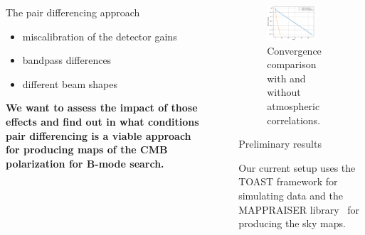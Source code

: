 \documentclass[final]{beamer}
\newlength{\sepwidth}
\newlength{\colwidth}
\newcommand{\separatorcolumn}{\begin{column}{\sepwidth}\end{column}}
\begin{document}
\begin{frame}[t]
\begin{columns}[t]
\begin{column}{\colwidth}
\begin{alertblock}{The pair differencing approach}
        \begin{itemize}
          \item miscalibration of the detector gains
          \item bandpass differences
          \item different beam shapes
        \end{itemize}

      \end{alertblock}

      \textbf{We want to assess the impact of those effects and find out in what conditions pair differencing is a viable approach for producing maps of the CMB polarization for B-mode search.}

    \end{column}

    \separatorcolumn

    \begin{column}{\colwidth}

      \begin{figure}
        \centering
        \includegraphics[width=0.7\textwidth]{figures/convergence.png}
        \caption{Convergence comparison with and without atmospheric correlations.}
        \label{fig:convergence}
      \end{figure}

      \begin{block}{Preliminary results}


        Our current setup uses the TOAST framework for simulating data and the MAPPRAISER library~\cite{ElBouhargani:2021umq} for producing the sky maps.


\end{block}
\end{column}
\end{columns}
\end{frame}
\end{document}

